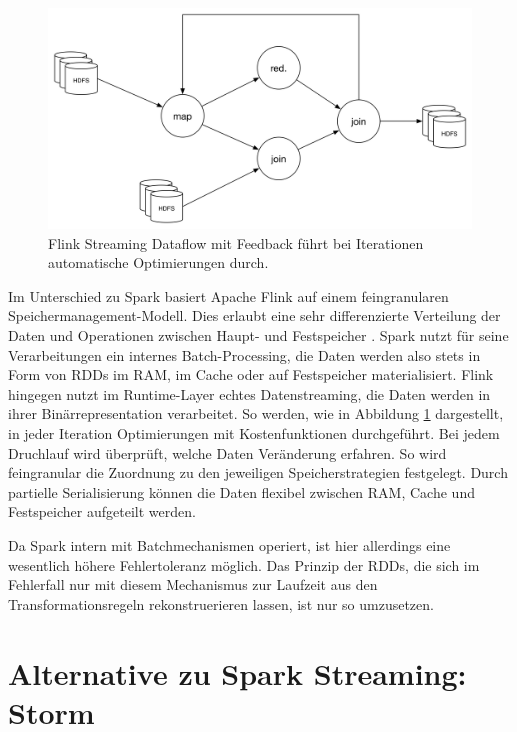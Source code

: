 \begin{figure}[htb!]
\centering
\includegraphics[width=1.0\textwidth]{bilder/flink.png}
\caption{Flink Streaming Dataflow mit Feedback führt bei Iterationen automatische Optimierungen durch.}
\label{fig:flink}
\end{figure} 

Im Unterschied zu Spark basiert Apache Flink auf einem feingranularen Speichermanagement-Modell. Dies erlaubt eine sehr differenzierte Verteilung der Daten und Operationen zwischen Haupt- und Festspeicher  . Spark nutzt für seine Verarbeitungen ein internes Batch-Processing, die Daten werden also stets in Form von RDDs im RAM, im Cache oder auf Festspeicher materialisiert. Flink hingegen nutzt im Runtime-Layer echtes Datenstreaming, die Daten werden in ihrer Binärrepresentation verarbeitet. So werden, wie in Abbildung \ref{fig:flink} dargestellt, in jeder Iteration Optimierungen mit Kostenfunktionen durchgeführt. Bei jedem Druchlauf wird überprüft, welche Daten Veränderung erfahren. So wird feingranular die Zuordnung zu den jeweiligen Speicherstrategien festgelegt. Durch partielle Serialisierung können die Daten flexibel zwischen RAM, Cache und Festspeicher aufgeteilt werden.

Da Spark intern mit Batchmechanismen operiert, ist hier allerdings eine wesentlich höhere Fehlertoleranz möglich. Das Prinzip der RDDs, die sich im Fehlerfall nur mit diesem Mechanismus zur Laufzeit aus den Transformationsregeln rekonstruerieren lassen, ist nur so umzusetzen. 


 



\section{Alternative zu Spark Streaming: Storm}
\label{section:storm}


